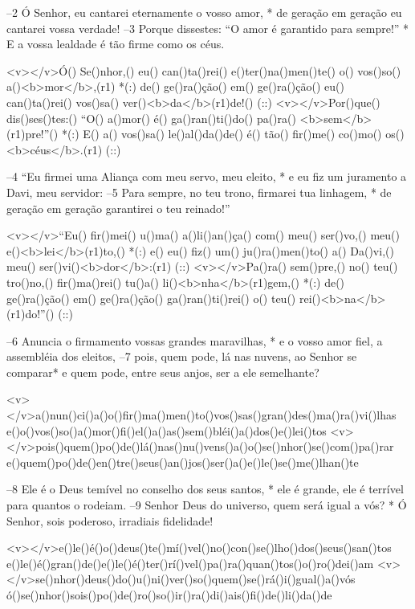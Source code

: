 –2 Ó Senhor, eu cantarei eternamente o vosso amor, *
de geração em geração eu cantarei vossa verdade! 
–3 Porque dissestes: “O amor é garantido para sempre!” *
E a vossa lealdade é tão firme como os céus.

<v></v>Ó() Se()nhor,() eu() can()ta()rei() e()ter()na()men()te() o() vos()so() a()<b>mor</b>,(r1) *(:)
de() ge()ra()ção() em() ge()ra()ção() eu() can()ta()rei() vos()sa() ver()<b>da</b>(r1)de!() (::)
<v></v>Por()que() dis()ses()tes:() ``O() a()mor() é() ga()ran()ti()do() pa()ra() <b>sem</b>(r1)pre!''() *(:)
E() a() vos()sa() le()al()da()de() é() tão() fir()me() co()mo() os() <b>céus</b>.(r1) (::)

–4 “Eu firmei uma Aliança com meu servo, meu eleito, *
e eu fiz um juramento a Davi, meu servidor: 
–5 Para sempre, no teu trono, firmarei tua linhagem, *
de geração em geração garantirei o teu reinado!”

<v></v>``Eu() fir()mei() u()ma() a()li()an()ça() com() meu() ser()vo,() meu() e()<b>lei</b>(r1)to,() *(:)
e() eu() fiz() um() ju()ra()men()to() a() Da()vi,() meu() ser()vi()<b>dor</b>:(r1) (::)
<v></v>Pa()ra() sem()pre,() no() teu() tro()no,() fir()ma()rei() tu()a() li()<b>nha</b>(r1)gem,() *(:)
de() ge()ra()ção() em() ge()ra()ção() ga()ran()ti()rei() o() teu() rei()<b>na</b>(r1)do!''() (::)

–6 Anuncia o firmamento vossas grandes maravilhas, *
e o vosso amor fiel, a assembléia dos eleitos, 
–7 pois, quem pode, lá nas nuvens, ao Senhor se comparar*
e quem pode, entre seus anjos, ser a ele semelhante?

<v></v>a()nun()ci()a()o()fir()ma()men()to()vos()sas()gran()des()ma()ra()vi()lhas
e()o()vos()so()a()mor()fi()el()a()as()sem()bléi()a()dos()e()lei()tos
<v></v>pois()quem()po()de()lá()nas()nu()vens()a()o()se()nhor()se()com()pa()rar
e()quem()po()de()en()tre()seus()an()jos()ser()a()e()le()se()me()lhan()te

–8 Ele é o Deus temível no conselho dos seus santos, *
ele é grande, ele é terrível para quantos o rodeiam. 
–9 Senhor Deus do universo, quem será igual a vós? *
Ó Senhor, sois poderoso, irradiais fidelidade!

<v></v>e()le()é()o()deus()te()mí()vel()no()con()se()lho()dos()seus()san()tos
e()le()é()gran()de()e()le()é()ter()rí()vel()pa()ra()quan()tos()o()ro()dei()am
<v></v>se()nhor()deus()do()u()ni()ver()so()quem()se()rá()i()gual()a()vós
ó()se()nhor()sois()po()de()ro()so()ir()ra()di()ais()fi()de()li()da()de

